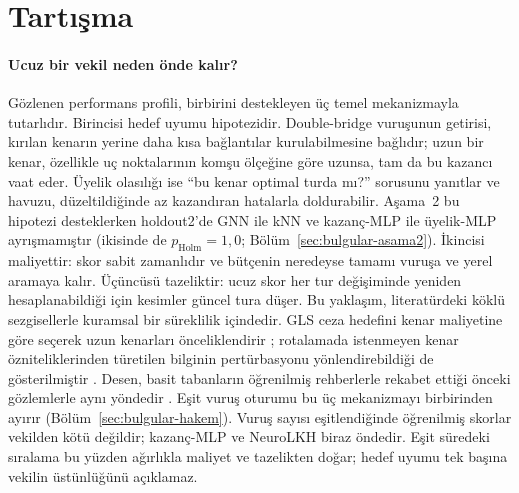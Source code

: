 \documentclass[pdflatex,sn-basic]{sn-jnl}
\begin{document}
\section{Tartışma}\label{sec:tartisma}

\paragraph{Ucuz bir vekil neden önde kalır?}
Gözlenen performans profili, birbirini destekleyen üç temel mekanizmayla tutarlıdır. Birincisi
hedef uyumu hipotezidir. Double-bridge vuruşunun getirisi, kırılan kenarın yerine daha kısa
bağlantılar kurulabilmesine bağlıdır; uzun bir kenar, özellikle uç noktalarının komşu ölçeğine
göre uzunsa, tam da bu kazancı vaat eder. Üyelik olasılığı ise ``bu kenar optimal turda mı?''
sorusunu yanıtlar ve havuzu, düzeltildiğinde az kazandıran hatalarla doldurabilir. Aşama~2 bu
hipotezi desteklerken holdout2'de GNN ile kNN ve kazanç-MLP ile üyelik-MLP ayrışmamıştır
(ikisinde de $p_{\mathrm{Holm}}=1{,}0$; Bölüm~\ref{sec:bulgular-asama2}).
İkincisi maliyettir: skor sabit zamanlıdır ve bütçenin neredeyse tamamı vuruşa ve yerel aramaya
kalır. Üçüncüsü tazeliktir: ucuz skor her tur değişiminde yeniden hesaplanabildiği için kesimler
güncel tura düşer. Bu yaklaşım, literatürdeki köklü sezgisellerle kuramsal bir süreklilik
içindedir. GLS ceza hedefini kenar maliyetine göre seçerek uzun kenarları önceliklendirir
\citep{voudouris_1999_gls}; rotalamada istenmeyen kenar özniteliklerinden türetilen bilginin
pertürbasyonu yönlendirebildiği de gösterilmiştir \citep{arnold_2019_kgls}. Desen, basit tabanların
öğrenilmiş rehberlerle rekabet ettiği önceki gözlemlerle aynı yöndedir
\citep{xia_2024_rethinking, bother_2022_wrong}.
Eşit vuruş oturumu bu üç mekanizmayı birbirinden ayırır (Bölüm~\ref{sec:bulgular-hakem}). Vuruş
sayısı eşitlendiğinde öğrenilmiş skorlar vekilden kötü değildir; kazanç-MLP ve NeuroLKH biraz öndedir.
Eşit süredeki sıralama bu yüzden ağırlıkla maliyet ve tazelikten doğar; hedef uyumu tek başına
vekilin üstünlüğünü açıklamaz.
\end{document}
